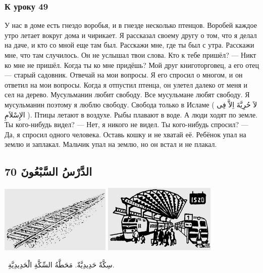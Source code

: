 \documentclass[a5paper]{article}
\begin{document}
\subsubsection{К уроку 49}
У нас в доме есть гнездо воробья, и в гнезде несколько птенцов. Воробей каждое утро летает вокруг дома и чирикает. Я рассказал своему другу о том, что я делал на даче, и кто со мной еще там был. Расскажи мне, где ты был с утра. Расскажи мне, что там случилось. Он не услышал твои слова. Кто к тебе пришёл? — Никт ко мне не пришёл. Когда ты ко мне придёшь? Мой друг книготорговец, а его отец — старый садовник. Отвечай на мои вопросы. Я его спросил о многом, и он ответил на мои вопросы. Когда я отпустил птенца, он улетел далеко от меня и сел на дерево. Мусульманин любит свободу. Все мусульмане любят свободу. Я мусульманин поэтому я люблю свободу. Свобода только в Исламе ( لاَ حُرِيَّةَ اِلاَّ فِى الإِسْلاَمِ ). Птицы летают в воздухе. Рыбы плавают в воде. А люди ходят по земле. Ты кого-нибудь видел? — Нет, я никого не видел. Ты кого-нибудь спросил? — Да, я спросил одного человека. Оставь кошку и не хватай её. Ребёнок упал на землю и заплакал. Мальчик упал на землю, но он встал и не плакал.

\subsection[الدَّرْسُ السَّبْعُونَ 70]{الدَّرْسُ السَّبْعُونَ 70}
 \includegraphics[width=2.0835in,height=1.2602in]{images/MuhammadBagauddinprettified-img219.png}   \includegraphics[width=2.1146in,height=1.2811in]{images/MuhammadBagauddinprettified-img220.png}  

\ سِكَّةٌ حَدِيدِيَّةٌ. مَحَطَّةُ السِّكَّةِ الْحَدِيدِيَّةِ. 
\end{document}

